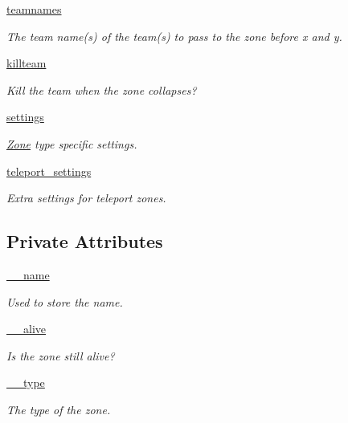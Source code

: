 \begin{DoxyCompactItemize}
\hyperlink{class_zone_1_1_zone_afcd2a65c9302b856a12d532f868e8cab}{teamnames}
\begin{DoxyCompactList}\small\item\em \-The team name(s) of the team(s) to pass to the zone before x and y. \end{DoxyCompactList}\item 
\hyperlink{class_zone_1_1_zone_a583bc681c535d3dd054dad0cfbad196e}{killteam}
\begin{DoxyCompactList}\small\item\em \-Kill the team when the zone collapses? \end{DoxyCompactList}\item 
\hyperlink{class_zone_1_1_zone_aca8cae5b57b366e26f69aad292c016f1}{settings}
\begin{DoxyCompactList}\small\item\em \hyperlink{class_zone_1_1_zone}{\-Zone} type specific settings. \end{DoxyCompactList}\item 
\hyperlink{class_zone_1_1_zone_ad8b6fa4a5f156693f861269f4254eb45}{teleport\-\_\-settings}
\begin{DoxyCompactList}\small\item\em \-Extra settings for teleport zones. \end{DoxyCompactList}\end{DoxyCompactItemize}
\subsection*{\-Private \-Attributes}
\begin{DoxyCompactItemize}
\item 
\hyperlink{class_zone_1_1_zone_ad2a884cf2ceb930d1eafe89d3ccab08d}{\-\_\-\-\_\-name}
\begin{DoxyCompactList}\small\item\em \-Used to store the name. \end{DoxyCompactList}\item 
\hyperlink{class_zone_1_1_zone_a8493bff8df9d7129f7cf97d7ae069817}{\-\_\-\-\_\-alive}
\begin{DoxyCompactList}\small\item\em \-Is the zone still alive? \end{DoxyCompactList}\item 
\hyperlink{class_zone_1_1_zone_a8330fbba60783f55e3cf63a6207744f1}{\-\_\-\-\_\-type}
\begin{DoxyCompactList}\small\item\em \-The type of the zone. \end{DoxyCompactList}\end{DoxyCompactItemize}
